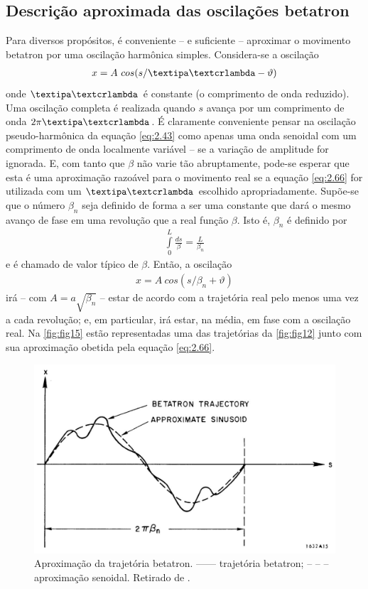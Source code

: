\subsection{Descrição aproximada das oscilações betatron}
Para diversos propósitos, é conveniente -- e suficiente -- aproximar o movimento betatron por uma oscilação harmônica simples. Considera-se a oscilação
\begin{align}
	x = A\ cos(s/ \lambdabar - \vartheta)\label{eq:2.66}
\end{align}
onde $\lambdabar$ é constante (o comprimento de onda reduzido). Uma oscilação completa é realizada quando $s$ avança por um comprimento de onda $2\pi \lambdabar$. É claramente conveniente pensar na oscilação pseudo-harmônica da equação \eqref{eq:2.43} como apenas uma onda senoidal com um comprimento de onda localmente variável -- se a variação de amplitude for ignorada. E, com tanto que $\beta$ não varie tão abruptamente, pode-se esperar que esta é uma aproximação razoável para o movimento real se a equação \eqref{eq:2.66} for utilizada com um $\lambdabar$ escolhido apropriadamente. Supõe-se que o número $\beta_n$ seja definido de forma a ser uma constante que dará o mesmo avanço de fase em uma revolução que a real função $\beta$. Isto é, $\beta_n$ é definido por
\begin{align}
	\int\limits_{0}^{L} \frac{ds}{\beta} = \frac{L}{\beta_n}\label{eq:2.67}
\end{align}
e é chamado de valor típico de $\beta$. Então, a oscilação
\begin{align}
	x = A\ cos(s/\beta_n + \vartheta)\label{eq:2.68}
\end{align}
irá -- com $A=a\sqrt{\beta_n}$ -- estar de acordo com a trajetória real pelo menos uma vez a cada revolução; e, em particular, irá estar, na média, em fase com a oscilação real. Na \autoref{fig:fig15} estão representadas uma das trajetórias da \autoref{fig:fig12} junto com sua aproximação obetida pela equação \eqref{eq:2.66}.

\begin{figure}[!htb]
	\centering
	\includegraphics[width=0.7\linewidth]{./Figuras/fig15.jpeg}
	\caption{Aproximação da trajetória betatron.  ------ trajetória betatron; -- -- --  aproximação senoidal. Retirado de \cite{sands1970physics}.}
	\label{fig:fig15}
\end{figure}


